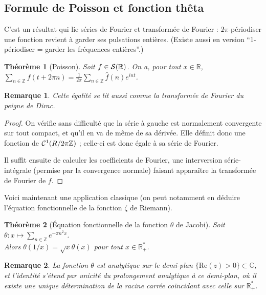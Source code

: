 \documentclass[a4paper, 11pt]{article}
\def\Z{\mathbb{Z}}
\def\R{\mathbb{R}}
\def\C{\mathbb{C}}
\def\S{{\cal{S}}}
\def\Cf{{\cal{C}}}
\newtheorem*{theorem}{Théorème}
\newtheorem*{remark}{Remarque}
\begin{document}
\newpage

\subsection{Formule de Poisson et fonction thêta}

C'est un résultat qui lie séries de Fourier et transformée de Fourier :
$2\pi$-périodiser une fonction revient à garder ses pulsations entières. (Existe
aussi en version \enquote{1-périodiser = garder les fréquences entières}.)

\begin{theorem}[Poisson]
  Soit $f \in \S(\R)$. On a, pour tout $x \in \R$,
  $\displaystyle \sum_{n \in \Z} f(t + 2\pi n) = \frac{1}{2\pi} \sum_{n \in \Z}
    \hat{f}(n)e^{int}$.
\end{theorem}

\begin{remark}
  Cette égalité se lit aussi comme la transformée de Fourier du peigne de Dirac.
\end{remark}

\begin{proof}
  On vérifie sans difficulté que la série à gauche est normalement convergente
  sur tout compact, et qu'il en va de même de sa dérivée. Elle définit donc une
  fonction de $\Cf^1(R/2\pi\Z)$ ; celle-ci est donc égale à sa série de Fourier.

  Il suffit ensuite de calculer les coefficients de Fourier, une interversion
  série-intégrale (permise par la convergence normale) faisant apparaître la
  transformée de Fourier de $f$.
\end{proof}

Voici maintenant une application classique (on peut notamment en déduire
l'équation fonctionnelle de la fonction $\zeta$ de Riemann).

\begin{theorem}[Équation fonctionnelle de la fonction $\theta$ de Jacobi]
  Soit $\theta : x \mapsto \sum_{n \in \Z} e^{-\pi n^2 x}$.\\
  Alors $\theta(1/x) = \sqrt{x}\theta(x)$ pour tout $x \in \R_+^*$.
\end{theorem}
\begin{remark}
  La fonction $\theta$ est analytique sur le demi-plan $\{\mathrm{Re}(z) > 0\}
  \subset \C$, et l'identité s'étend par unicité du prolongement analytique à ce
  demi-plan, où il existe une unique détermination de la racine carrée
  coïncidant avec celle sur $\R^*_+$.
\end{remark}
\end{document}
